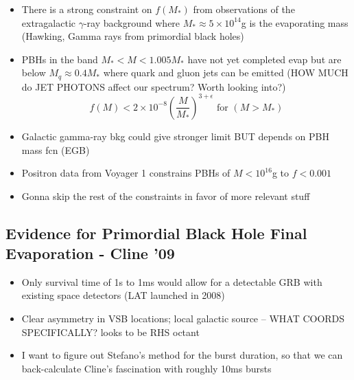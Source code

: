 \documentclass[12pt]{article}
\begin{document}
\begin{itemize}
    \item There is a strong constraint on $f(M_*)$ from observations of the extragalactic $\gamma$-ray background where $M_* \approx 5\times10^14$g is the evaporating mass (Hawking, Gamma rays from primordial black holes)
    \item PBHs in the band $M_* < M < 1.005M_*$ have not yet completed evap but are below $M_q \approx 0.4M_*$ where quark and gluon jets can be emitted (HOW MUCH do JET PHOTONS affect our spectrum? Worth looking into?)
    $$f(M) < 2\times10^{-8}(\frac{M}{M_*})^{3 +\epsilon} \mbox{ for } (M>M_*)$$
    \item Galactic gamma-ray bkg could give stronger limit BUT depends on PBH mass fcn (EGB)
    \item Positron data from Voyager 1 constrains PBHs of $M<10^16$g to $f<0.001$
    \item Gonna skip the rest of the constraints in favor of more relevant stuff
\end{itemize}

\subsection{Evidence for Primordial Black Hole Final Evaporation - Cline '09}
\begin{itemize}
    \item Only survival time of 1s to 1ms would allow for a detectable GRB with existing space detectors (LAT launched in 2008)
    \item Clear asymmetry in VSB locations; local galactic source  -- WHAT COORDS SPECIFICALLY? looks to be RHS octant
    \item I want to figure out Stefano's method for the burst duration, so that we can back-calculate Cline's fascination with roughly 10ms bursts
\end{itemize}
\end{document}
